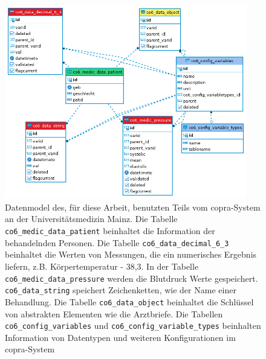 \clearpage

\begin{figure}[ht]
	\centering
	\includegraphics[height=8.5cm]{figures/copra_data_model_data}
	\caption[Datenmodel von \acs{copra}]{Datenmodel des, für diese Arbeit, benutzten Teils vom \ac{copra}-System an der Universitätsmedizin Mainz. Die Tabelle \texttt{co6\_medic\_data\_patient} beinhaltet die Information der behandelnden Personen. Die Tabelle \texttt{co6\_data\_decimal\_6\_3} beinhaltet die Werten von Messungen, die ein numerisches Ergebnis liefern, z.B. Körpertemperatur - 38,3. In der Tabelle \texttt{co6\_medic\_data\_pressure} werden die Blutdruck Werte gespeichert. \texttt{co6\_data\_string} speichert Zeichenketten, wie der Name einer Behandlung. Die Tabelle \texttt{co6\_data\_object} beinhaltet die Schlüssel von abstrakten Elementen wie die Arztbriefe.
		Die Tabellen \texttt{co6\_config\_variables} und \texttt{co6\_config\_variable\_types} beinhalten  Information von Datentypen und weiteren Konfigurationen im \ac{copra}-System}
	\label{fig:copraschema}
\end{figure}